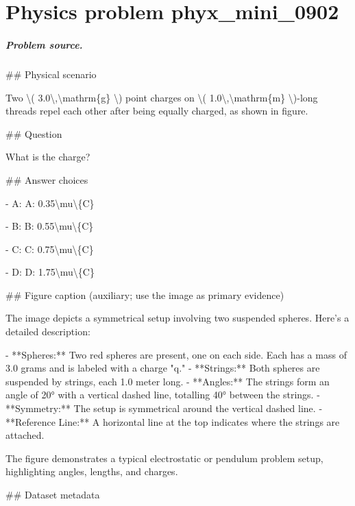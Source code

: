 
\chapter{Physics problem phyx\_mini\_0902}
\label{ch:PhyXMiniProblems_problem_phyx_mini_0902}

\paragraph{Problem source.}
\#\# Physical scenario

Two \textbackslash{}( 3.0\textbackslash{},\textbackslash{}mathrm\{g\} \textbackslash{}) point charges on \textbackslash{}( 1.0\textbackslash{},\textbackslash{}mathrm\{m\} \textbackslash{})-long threads repel each other after being equally charged, as shown in figure.

\#\# Question

What is the charge?

\#\# Answer choices

- A: A: 0.35\textbackslash{}mu\textbackslash{}\{C\}

- B: B: 0.55\textbackslash{}mu\textbackslash{}\{C\}

- C: C: 0.75\textbackslash{}mu\textbackslash{}\{C\}

- D: D: 1.75\textbackslash{}mu\textbackslash{}\{C\}

\#\# Figure caption (auxiliary; use the image as primary evidence)

The image depicts a symmetrical setup involving two suspended spheres. Here's a detailed description:

- **Spheres:** Two red spheres are present, one on each side. Each has a mass of 3.0 grams and is labeled with a charge "q."
- **Strings:** Both spheres are suspended by strings, each 1.0 meter long.
- **Angles:** The strings form an angle of 20° with a vertical dashed line, totalling 40° between the strings.
- **Symmetry:** The setup is symmetrical around the vertical dashed line.
- **Reference Line:** A horizontal line at the top indicates where the strings are attached.

The figure demonstrates a typical electrostatic or pendulum problem setup, highlighting angles, lengths, and charges.

\#\# Dataset metadata

